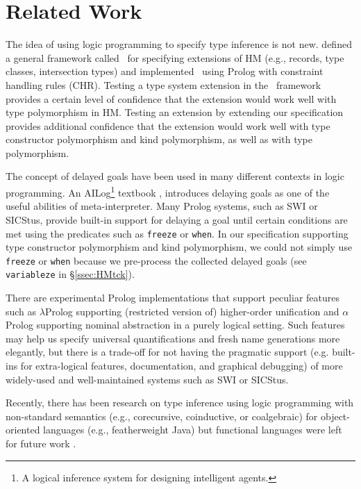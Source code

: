 \section{Related Work}\label{sec:relwork}
The idea of using logic programming to specify type inference is not new.
\citet*{HMX99} defined a general framework called \HMX\ for specifying
extensions of HM (e.g., records, type classes, intersection types)
and \citet{tyinferCHR02} implemented \HMX\ using Prolog with
constraint handling rules (CHR). Testing a type system extension
in the \HMX\ framework provides a certain level of confidence that the extension
would work well with type polymorphism in HM. Testing an extension by
extending our specification provides additional confidence that the extension
would work well with type constructor polymorphism and kind polymorphism,
as well as with type polymorphism.

The concept of delayed goals have been used in many different contexts
in logic programming. An AILog\footnote{A logical inference system for designing
	 intelligent agents.} textbook \cite{AILogTextBook},
introduces delaying goals as one of the useful abilities of meta-interpreter.
Many Prolog systems, such as SWI or SICStus, provide built-in support for
delaying a goal until certain conditions are met using the predicates
such as \verb|freeze| or \verb|when|. In our specification supporting
type constructor polymorphism and kind polymorphism, we could not
simply use \verb|freeze| or \verb|when| because we pre-process
the collected delayed goals (see \verb|variableze| in \S\ref{ssec:HMtck}).


There are experimental Prolog implementations that support peculiar features
such as
$\lambda$Prolog \cite{nadathur99cade}
supporting (restricted version of) higher-order unification
and 
$\alpha$Prolog \cite{cheney04iclp}
supporting nominal abstraction in a purely logical setting.
Such features may help us specify universal quantifications and fresh name
generations more elegantly, but there is a trade-off for not having the
pragmatic support (e.g. built-ins for extra-logical features, documentation, and
graphical debugging) of more widely-used and well-maintained systems
such as SWI or SICStus.

Recently, there has been research on type inference using logic programming
with non-standard semantics (e.g., corecursive, coinductive, or coalgebraic)
for object-oriented languages (e.g., featherweight Java) but
functional languages were left for future work \cite{AnconaLZ08}.

